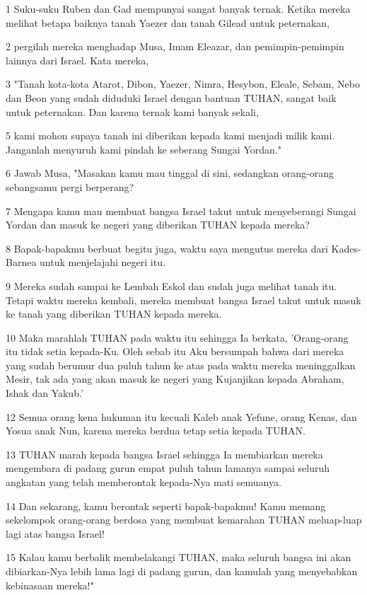 \par 1 Suku-suku Ruben dan Gad mempunyai sangat banyak ternak. Ketika mereka melihat betapa baiknya tanah Yaezer dan tanah Gilead untuk peternakan,
\par 2 pergilah mereka menghadap Musa, Imam Eleazar, dan pemimpin-pemimpin lainnya dari Israel. Kata mereka,
\par 3 "Tanah kota-kota Atarot, Dibon, Yaezer, Nimra, Hesybon, Eleale, Sebam, Nebo dan Beon yang sudah diduduki Israel dengan bantuan TUHAN, sangat baik untuk peternakan. Dan karena ternak kami banyak sekali,
\par 5 kami mohon supaya tanah ini diberikan kepada kami menjadi milik kami. Janganlah menyuruh kami pindah ke seberang Sungai Yordan."
\par 6 Jawab Musa, "Masakan kamu mau tinggal di sini, sedangkan orang-orang sebangsamu pergi berperang?
\par 7 Mengapa kamu mau membuat bangsa Israel takut untuk menyeberangi Sungai Yordan dan masuk ke negeri yang diberikan TUHAN kepada mereka?
\par 8 Bapak-bapakmu berbuat begitu juga, waktu saya mengutus mereka dari Kades-Barnea untuk menjelajahi negeri itu.
\par 9 Mereka sudah sampai ke Lembah Eskol dan sudah juga melihat tanah itu. Tetapi waktu mereka kembali, mereka membuat bangsa Israel takut untuk masuk ke tanah yang diberikan TUHAN kepada mereka.
\par 10 Maka marahlah TUHAN pada waktu itu sehingga Ia berkata, 'Orang-orang itu tidak setia kepada-Ku. Oleh sebab itu Aku bersumpah bahwa dari mereka yang sudah berumur dua puluh tahun ke atas pada waktu mereka meninggalkan Mesir, tak ada yang akan masuk ke negeri yang Kujanjikan kepada Abraham, Ishak dan Yakub.'
\par 12 Semua orang kena hukuman itu kecuali Kaleb anak Yefune, orang Kenas, dan Yosua anak Nun, karena mereka berdua tetap setia kepada TUHAN.
\par 13 TUHAN marah kepada bangsa Israel sehingga Ia membiarkan mereka mengembara di padang gurun empat puluh tahun lamanya sampai seluruh angkatan yang telah memberontak kepada-Nya mati semuanya.
\par 14 Dan sekarang, kamu berontak seperti bapak-bapakmu! Kamu memang sekelompok orang-orang berdosa yang membuat kemarahan TUHAN meluap-luap lagi atas bangsa Israel!
\par 15 Kalau kamu berbalik membelakangi TUHAN, maka seluruh bangsa ini akan dibiarkan-Nya lebih lama lagi di padang gurun, dan kamulah yang menyebabkan kebinasaan mereka!"
